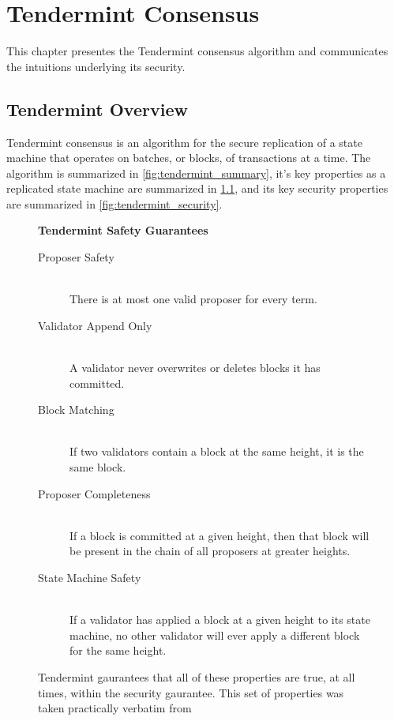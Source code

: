 \chapter{Tendermint Consensus}
\label{ch:tendermint}

This chapter presentes the Tendermint consensus algorithm and communicates the intuitions underlying its security.

\section{Tendermint Overview}

Tendermint consensus is an algorithm for the secure replication of a state machine that operates on batches, or blocks, of transactions at a time.
The algorithm is summarized in \ref{fig:tendermint_summary}, it's key properties as a replicated state machine are summarized in \ref{fig:tendermint_gaurantees}, and its key security properties are summarized in \ref{fig:tendermint_security}.

\begin{figure}[]
	\textbf{Tendermint Safety Guarantees}
	\begin{description}
	  \item[Proposer Safety] \hfill \\
		There is at most one valid proposer for every term.
	  \item[Validator Append Only] \hfill \\
		A validator never overwrites or deletes blocks it has committed.
	  \item[Block Matching] \hfill \\
		If two validators contain a block at the same height, it is the same block.
	  \item[Proposer Completeness] \hfill \\
		If a block is committed at a given height, then that block will be present in the chain of all proposers at greater heights.
	  \item[State Machine Safety] \hfill \\
		If a validator has applied a block at a given height to its state machine, no other validator will ever apply a different block for the same height.
	\end{description}
	\label{fig:tendermint_gaurantees}
  \caption{Tendermint gaurantees that all of these properties are true, at all times, within the security gaurantee. This set of properties was taken practically verbatim from \cite{raft_thesis}}
\end{figure}

